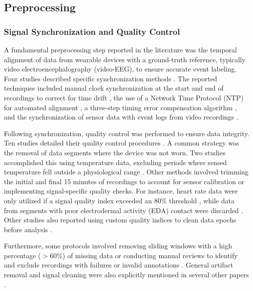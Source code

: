 \subsection{Preprocessing}

\subsubsection{Signal Synchronization and Quality Control}
A fundamental preprocessing step reported in the literature was the temporal alignment of data from wearable devices with a ground-truth reference, typically video electroencephalography (video-EEG), to ensure accurate event labeling. Four studies described specific synchronization methods \cite{Yu2023-ss, Vakilna2024-hk, Arends2018-ew, Tang2021-td}. The reported techniques included manual clock synchronization at the start and end of recordings to correct for time drift \cite{Yu2023-ss}, the use of a Network Time Protocol (NTP) for automated alignment \cite{Vakilna2024-hk}, a three-step timing error compensation algorithm \cite{Tang2021-td}, and the synchronization of sensor data with event logs from video recordings \cite{Arends2018-ew}.

Following synchronization, quality control was performed to ensure data integrity. Ten studies detailed their quality control procedures \cite{Yu2023-ss, Li2022-ty, Arends2018-ew, Jiang2022-zu, Wang2025-my, Nasseri2021-xn, Tang2021-td, Ali2020-ke, Ge2023-ab, Hegarty-Craver2021-hk}. A common strategy was the removal of data segments where the device was not worn. Two studies accomplished this using temperature data, excluding periods where sensed temperature fell outside a physiological range \cite{Yu2023-ss, Tang2021-td}. Other methods involved trimming the initial and final 15 minutes of recordings to account for sensor calibration \cite{Yu2023-ss} or implementing signal-specific quality checks. For instance, heart rate data were only utilized if a signal quality index exceeded an 80\% threshold \cite{Arends2018-ew}, while data from segments with poor electrodermal activity (EDA) contact were discarded \cite{Li2022-ty}. Other studies also reported using custom quality indices to clean data epochs before analysis \cite{Nasseri2021-xn, Wang2025-my}.

Furthermore, some protocols involved removing sliding windows with a high percentage ($>$60\%) of missing data \cite{Jiang2022-zu} or conducting manual reviews to identify and exclude recordings with failures or invalid annotations \cite{Yu2023-ss}. General artifact removal and signal cleaning were also explicitly mentioned in several other papers \cite{Ge2023-ab, Hegarty-Craver2021-hk, Ali2020-ke}.


